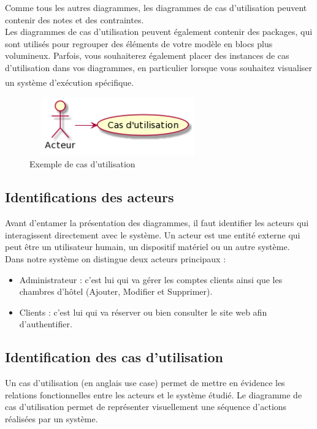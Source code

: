 \documentclass[12pt]{report}
\begin{document}
\hspace*{0.16in}
Comme tous les autres diagrammes, les diagrammes de cas d'utilisation peuvent contenir des notes et des contraintes.
\\
\hspace*{0.16in}
Les diagrammes de cas d'utilisation peuvent également contenir des packages, qui sont utilisés pour regrouper des éléments de votre modèle en blocs plus volumineux. Parfois, vous souhaiterez également placer des instances de cas d'utilisation dans vos diagrammes, en particulier lorsque vous souhaitez visualiser un système d'exécution spécifique.\textsuperscript{\cite{booch2005unified}}


\begin{figure}[h]
\centering
    \includegraphics[width = 3.0in, height = 1.0in]{../images/usecaseEG.png}
    \caption{Exemple de cas d'utilisation}
\end{figure}

\vspace*{-0.4in}
\subsection{Identifications des acteurs}
\hspace*{0.16in}
Avant d’entamer la présentation des diagrammes, il faut identifier les acteurs qui interagissent directement avec le système. Un acteur est une entité externe qui peut être un utilisateur humain, un dispositif matériel ou un autre système.
\\
Dans notre système on distingue deux acteurs principaux :

\begin{itemize}
    \item Administrateur : c’est lui qui va gérer les comptes clients ainsi que les chambres d’hôtel (Ajouter, Modifier et Supprimer).
    \item Clients : c'est lui qui va réserver ou bien consulter le site web afin d'authentifier.
\end{itemize}

\newpage

\vspace*{-0.6in}
\subsection{Identification des cas d’utilisation}
\hspace*{0.16in}
Un cas d'utilisation (en anglais use case) permet de mettre en évidence les relations fonctionnelles entre les acteurs et le système étudié. Le diagramme de cas d'utilisation permet de représenter visuellement une séquence d'actions réalisées par un système.
\end{document}

